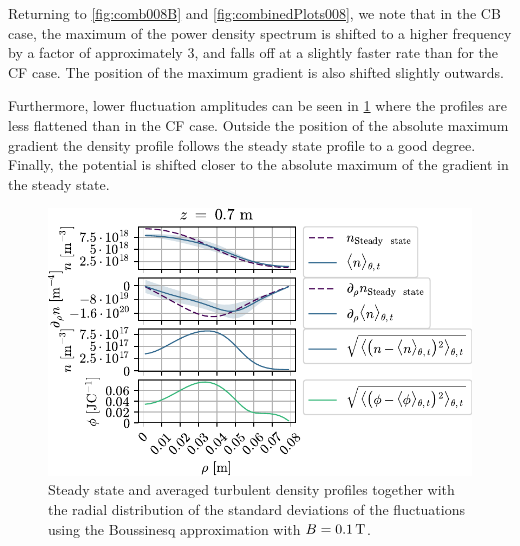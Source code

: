 %

Returning to \cref{fig:comb008B} and \cref{fig:combinedPlots008}, we note that in the CB case, the maximum of the power density spectrum is shifted to a higher frequency by a factor of approximately $3$, and falls off at a slightly faster rate than for the CF case.
The position of the maximum gradient is also shifted slightly outwards.

Furthermore, lower fluctuation amplitudes can be seen in \cref{fig:fluctProfiles01B} where the profiles are less flattened than in the CF case.
Outside the position of the absolute maximum gradient the density profile follows the steady state profile to a good degree.
Finally, the potential is shifted closer to the absolute maximum of the gradient in the steady state.
%
\begin{figure}[htb]
    \centering
    \includegraphics{fig/results/compareBouss/fluctProfiles01B}
    \caption{Steady state and averaged turbulent density profiles together with the radial distribution of the standard deviations of the fluctuations using the Boussinesq approximation with $B=0.1\, \text{T}$.}
    \label{fig:fluctProfiles01B}
\end{figure}
%
